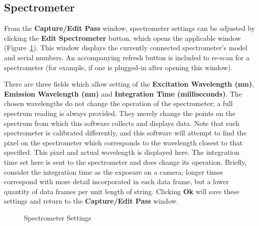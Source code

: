 \documentclass[10pt,letterpaper,titlepage]{article}
\begin{document}
    \subsection{Spectrometer}
    From the \textbf{Capture/Edit Pass} window, spectrometer settings can be adjusted by clicking the \textbf{Edit Spectrometer} button, which opens the applicable window (Figure~\ref{fig:spectrometer_settings}). This window displays the currently connected spectrometer's model and serial numbers. An accompanying refresh button is included to re-scan for a spectrometer (for example, if one is plugged-in after opening this window).\par
    There are three fields which allow setting of the \textbf{Excitation Wavelength (nm)}, \textbf{Emission Wavelength (nm)} and \textbf{Integration Time (milliseconds)}. The chosen wavelengths do not change the operation of the spectrometer; a full spectrum reading is always provided. They merely change the points on the spectrum from which this software collects and displays data. Note that each spectrometer is calibrated differently, and this software will attempt to find the pixel on the spectrometer which corresponds to the wavelength closest to that specified. This pixel and actual wavelength is displayed here. The integration time set here is sent to the spectrometer and does change its operation. Briefly, consider the integration time as the exposure on a camera; longer times correspond with more detail incorporated in each data frame, but a lower quantity of data frames per unit length of string. Clicking \textbf{Ok} will save these settings and return to the \textbf{Capture/Edit Pass} window.
    \begin{figure}[hb]
        \centering
        \caption{Spectrometer Settings}
        \label{fig:spectrometer_settings}
    \end{figure}
    \FloatBarrier
    \newpage
\end{document}
